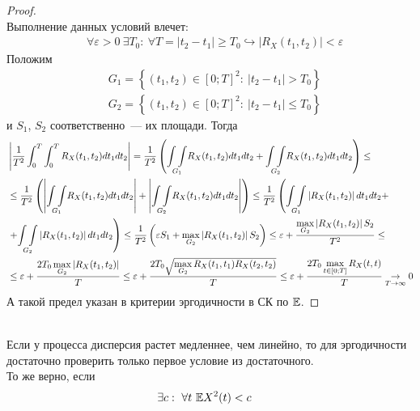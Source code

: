 \begin{proof}
    ~
    \\
    Выполнение данных условий влечет:
    \begin{align*}
      & \forall \varepsilon > 0 \ \exists T_0: \ \forall T = \left| t_2-t_1 \right|\geq T_0 \hookrightarrow \left| R_X(t_1,t_2) \right| < \varepsilon
    \end{align*}
    Положим
    \begin{align*}
      & G_1 = \left\{ (t_1,t_2) \in [0;T]^2: \ \left| t_2-t_1 \right| > T_0 \right\}
    \end{align*}
    \begin{align*}
      & G_2 = \left\{ (t_1,t_2) \in [0;T]^2: \ \left| t_2-t_1 \right| \leq T_0 \right\}
    \end{align*}
    и $S_1$, $S_2$ соответственно~--- их площади. Тогда
    \begin{align*}
      & \left| \frac{1}{T^2} \int_0^T\int_0^TR_X(t_1,t_2)dt_1dt_2 \right| = \frac{1}{T^2} \left( \underset{G_1}{\int\int}R_X(t_1,t_2)dt_1dt_2 + \underset{G_2}{\int\int}R_X(t_1,t_2)dt_1dt_2 \right) \leq \\
      & \leq \frac{1}{T^2} \left( \left| \underset{G_1}{\int\int}R_X(t_1,t_2)dt_1dt_2 \right| + \left| \underset{G_2}{\int\int}R_X(t_1,t_2)dt_1dt_2 \right| \right) \leq \frac{1}{T^2} \left( \underset{G_1}{\int\int}\left| R_X(t_1,t_2) \right| dt_1dt_2 + \right. \\
      & \left. + \underset{G_2}{\int\int}\left| R_X(t_1,t_2) \right| dt_1dt_2 \right) \leq \frac{1}{T^2} \left( \varepsilon S_1 + \max_{G_2}\left| R_X(t_1,t_2) \right| S_2 \right) \leq \varepsilon + \frac{\displaystyle \max_{G_2}\left| R_X(t_1,t_2) \right| S_2}{T^2} \leq \\
      & \leq \varepsilon + \frac{2T_0 \displaystyle \max_{G_2}\left| R_X(t_1,t_2) \right|}{T} \leq \varepsilon + \frac{2T_0 \sqrt{\displaystyle \max_{G_2} R_X(t_1,t_1)R_X(t_2,t_2)}}{T} \leq \varepsilon + \frac{2T_0 \displaystyle \max_{t \in [0;T]} R_X(t,t)}{T} \underset{T \to \infty}\rightarrow 0
    \end{align*}
    А такой предел указан в критерии эргодичности в СК по $\mathbb{E}$.
\end{proof}
\begin{Note}
    ~
    \\
    Если у процесса дисперсия растет медленнее, чем линейно, то для эргодичности
    достаточно проверить только первое условие из достаточного.
    \\
    То же верно, если
    \begin{align*}
      & \exists c: \ \forall t \ \mathbb{E} X^2(t) < c
    \end{align*}
\end{Note}

